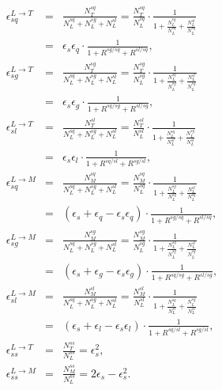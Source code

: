 \begin{eqnarray}
\epsilon_{sq}^{L \rightarrow T} & = & \frac{N_{T}^{sq}}{N_{L}^{sq}+N_{L}^{sg}+N_{L}^{sl}} = \frac{N_{T}^{sq}}{N_{L}^{sq}} \cdot \frac{1}{1 + \frac{N_{L}^{sg}}{N_{L}^{sq}} + \frac{N_{L}^{sl}}{N_{L}^{sq}}} \nonumber \\
& = & \epsilon_{s} \epsilon_{q} \cdot \frac{1}{1 + R^{sg/sq} + R^{sl/sq}}, \label{eq:eps17_}\\
\epsilon_{sg}^{L \rightarrow T} & = & \frac{N_{T}^{sg}}{N_{L}^{sq}+N_{L}^{sg}+N_{L}^{sl}} = \frac{N_{T}^{sg}}{N_{L}^{sg}} \cdot \frac{1}{1 + \frac{N_{L}^{sq}}{N_{L}^{sg}} + \frac{N_{L}^{sl}}{N_{L}^{sg}}} \nonumber \\
& = & \epsilon_{s} \epsilon_{g} \cdot \frac{1}{1 + R^{sq/sg} + R^{sl/sg}}, \label{eq:eps17__}\\
\epsilon_{sl}^{L \rightarrow T} & = & \frac{N_{T}^{sl}}{N_{L}^{sq}+N_{L}^{sg}+N_{L}^{sl}} = \frac{N_{T}^{sl}}{N_{L}^{sl}} \cdot \frac{1}{1 + \frac{N_{L}^{sq}}{N_{L}^{sl}} + \frac{N_{L}^{sg}}{N_{L}^{sl}}} \nonumber \\
& = & \epsilon_{s} \epsilon_{l} \cdot \frac{1}{1 + R^{sq/sl} + R^{sg/sl}}, \label{eq:eps17___}\\
\epsilon_{sq}^{L \rightarrow M} & = & \frac{N_{M}^{sq}}{N_{L}^{sq}+N_{L}^{sg}+N_{L}^{sl}} = \frac{N_{M}^{sq}}{N_{L}^{sq}} \cdot \frac{1}{1 + \frac{N_{L}^{sg}}{N_{L}^{sq}} + \frac{N_{L}^{sl}}{N_{L}^{sq}}} \nonumber \\
& = & \left( \epsilon_{s} + \epsilon_{q} - \epsilon_{s} \epsilon_{q} \right) \cdot \frac{1}{1 + R^{sg/sq} + R^{sl/sq}}, \label{eq:eps18_}\\
\epsilon_{sg}^{L \rightarrow M} & = & \frac{N_{M}^{sg}}{N_{L}^{sq}+N_{L}^{sg}+N_{L}^{sl}} = \frac{N_{M}^{sg}}{N_{L}^{sg}} \cdot \frac{1}{1 + \frac{N_{L}^{sq}}{N_{L}^{sg}} + \frac{N_{L}^{sl}}{N_{L}^{sg}}} \nonumber \\
& = & \left( \epsilon_{s} + \epsilon_{g} - \epsilon_{s} \epsilon_{g} \right) \cdot \frac{1}{1 + R^{sq/sg} + R^{sl/sg}}, \label{eq:eps18__}\\
\epsilon_{sl}^{L \rightarrow M} & = & \frac{N_{M}^{sl}}{N_{L}^{sq}+N_{L}^{sg}+N_{L}^{sl}} = \frac{N_{M}^{sl}}{N_{L}^{sl}} \cdot \frac{1}{1 + \frac{N_{L}^{sq}}{N_{L}^{sl}} + \frac{N_{L}^{sg}}{N_{L}^{sl}}} \nonumber \\
& = & \left( \epsilon_{s} + \epsilon_{l} - \epsilon_{s} \epsilon_{l} \right) \cdot \frac{1}{1 + R^{sq/sl} + R^{sg/sl}}, \label{eq:eps18___}\\
\epsilon_{ss}^{L \rightarrow T} & = & \frac{N_{T}^{ss}}{N_{L}^{ss}} = \epsilon_{s}^2, \label{eq:eps21_}\\
\epsilon_{ss}^{L \rightarrow M} & = & \frac{N_{M}^{ss}}{N_{L}^{ss}} = 2 \epsilon_{s} - \epsilon_{s}^2. \label{eq:eps22_}
\end{eqnarray}

